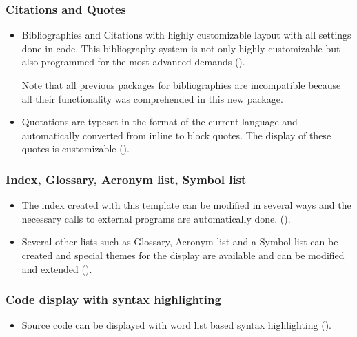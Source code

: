 \subsubsection*{Citations and Quotes}
\begin{itemize}
\item Bibliographies and Citations with highly customizable layout with all settings done in \latex code. This bibliography system is not only highly customizable but also programmed for the most advanced demands (). 
 
Note that all previous packages for bibliographies are incompatible because all their functionality was comprehended in this new package. 
%
\item Quotations are typeset in the format of the current language and automatically converted from inline to block quotes. The display of these quotes is customizable ().  
\end{itemize}

\subsubsection*{Index, Glossary, Acronym list, Symbol list}
\begin{itemize}
\item The index created with this template can be modified in several ways and the necessary calls to external programs are automatically done. ().   
%
\item Several other lists such as Glossary, Acronym list and a Symbol list can be created and special themes for the display are available and can be modified and extended ().
\end{itemize}

\subsubsection*{Code display with syntax highlighting}
\begin{itemize}
\item Source code can be displayed with word list based syntax highlighting ().
\end{itemize}

